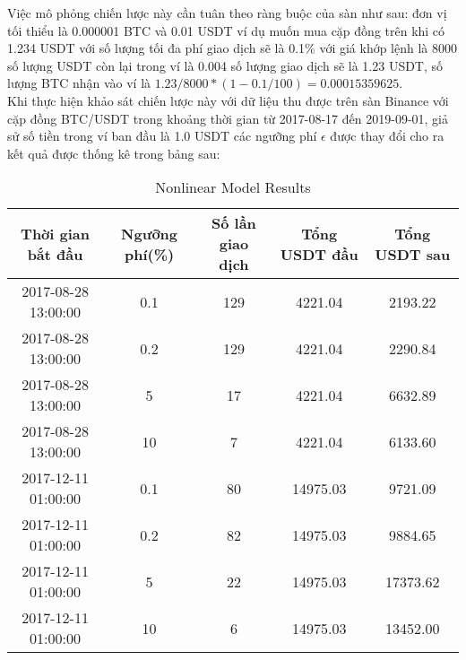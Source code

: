 Việc mô phỏng chiến lược này cần tuân theo ràng buộc của sàn như sau: đơn vị tối thiểu là 0.000001 BTC và 0.01 USDT ví dụ muốn mua cặp đồng trên khi có 1.234 USDT với số lượng tối đa phí giao dịch sẽ là 0.1\% với giá khớp lệnh là 8000 số lượng USDT còn lại trong ví là 0.004 số lượng giao dịch sẽ là 1.23 USDT, số lượng BTC nhận vào ví là $1.23/8000*(1-0.1/100) = 0.00015359625$.\\

Khi thực hiện khảo sát chiến lược này với dữ liệu thu được trên sàn Binance với cặp đồng BTC/USDT trong khoảng thời gian từ 2017-08-17
đến 2019-09-01, giả sử số tiền trong ví ban đầu là 1.0 USDT các ngưỡng phí  $\epsilon$ được thay đổi cho ra kết quả được thống kê trong bảng sau:
\begin{table}[ht]
\caption{Nonlinear Model Results} %
\centering %
\begin{tabular}{c c c c c} %
\hline\hline %
Thời gian bắt đầu & Ngưỡng phí(\%) & Số lần giao dịch & Tổng USDT đầu & Tổng USDT sau \\ [0.5ex] %

\hline %
2017-08-28 13:00:00 & 0.1 & 129 & 4221.04 & 2193.22 \\ %
2017-08-28 13:00:00 & 0.2 & 129 & 4221.04 & 2290.84 \\
2017-08-28 13:00:00 & 5 & 17 & 4221.04 & 6632.89 \\
2017-08-28 13:00:00 & 10 & 7 & 4221.04 & 6133.60 \\

2017-12-11 01:00:00 & 0.1 & 80 & 14975.03 & 9721.09 \\
2017-12-11 01:00:00 & 0.2 & 82 & 14975.03 & 9884.65 \\
2017-12-11 01:00:00 & 5 & 22 & 14975.03 & 17373.62 \\
2017-12-11 01:00:00 & 10 & 6 & 14975.03 & 13452.00 \\[1ex] %



\hline %
\end{tabular}
\label{table:nonlin} %
\end{table}

